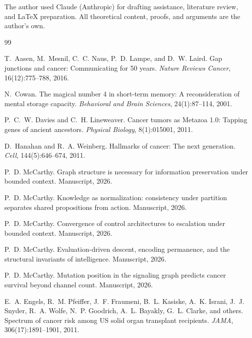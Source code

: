 \documentclass[11pt]{article}
\begin{document}
The author used Claude (Anthropic) for drafting assistance, literature review, and \LaTeX{} preparation. All theoretical content, proofs, and arguments are the author's own.


\begin{thebibliography}{99}

T.~Aasen, M.~Mesnil, C.~C. Naus, P.~D. Lampe, and D.~W. Laird.
\newblock Gap junctions and cancer: Communicating for 50 years.
\newblock \emph{Nature Reviews Cancer}, 16(12):775--788, 2016.

N.~Cowan.
\newblock The magical number 4 in short-term memory: A reconsideration of
  mental storage capacity.
\newblock \emph{Behavioral and Brain Sciences}, 24(1):87--114, 2001.

P.~C.~W. Davies and C.~H. Lineweaver.
\newblock Cancer tumors as {Metazoa} 1.0: Tapping genes of ancient ancestors.
\newblock \emph{Physical Biology}, 8(1):015001, 2011.

D.~Hanahan and R.~A. Weinberg.
\newblock Hallmarks of cancer: The next generation.
\newblock \emph{Cell}, 144(5):646--674, 2011.

P.~D. McCarthy.
\newblock Graph structure is necessary for information preservation under
  bounded context.
\newblock Manuscript, 2026.

P.~D. McCarthy.
\newblock Knowledge as normalization: consistency under partition separates
  shared propositions from action.
\newblock Manuscript, 2026.

P.~D. McCarthy.
\newblock Convergence of control architectures to escalation under bounded context.
\newblock Manuscript, 2026.

P.~D. McCarthy.
\newblock Evaluation-driven descent, encoding permanence, and the structural
  invariants of intelligence.
\newblock Manuscript, 2026.

P.~D. McCarthy.
\newblock Mutation position in the signaling graph predicts cancer survival
  beyond channel count.
\newblock Manuscript, 2026.

E.~A. Engels, R.~M. Pfeiffer, J.~F. Fraumeni, B.~L. Kasiske,
  A.~K. Israni, J.~J. Snyder, R.~A. Wolfe, N.~P. Goodrich,
  A.~L. Bayakly, G.~L. Clarke, and others.
\newblock Spectrum of cancer risk among {US} solid organ transplant
  recipients.
\newblock \emph{JAMA}, 306(17):1891--1901, 2011.


\end{thebibliography}
\end{document}
